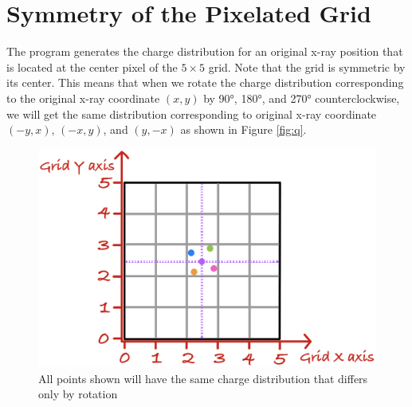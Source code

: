 \documentclass{article}
\begin{document}
\section{Symmetry of the Pixelated Grid}
The program generates the charge distribution for an original x-ray position that is located at the center pixel of the $5\times 5$ grid. Note that the grid is symmetric by its center. This means that when we rotate the charge distribution corresponding to the original x-ray coordinate $(x,y)$ by 90°, 180°, and 270° counterclockwise, we will get the same distribution corresponding to original x-ray coordinate $(-y,x)$, $(-x,y)$, and $(y,-x)$ as shown in Figure \ref{fig:q}.



\begin{figure}[H]
    \centering
    \includegraphics[width=0.8\linewidth]{images/rotation.png}
    \caption{All points shown will have the same charge distribution that differs only by rotation}
    \label{fig:symmetry}
\end{figure}
\end{document}
